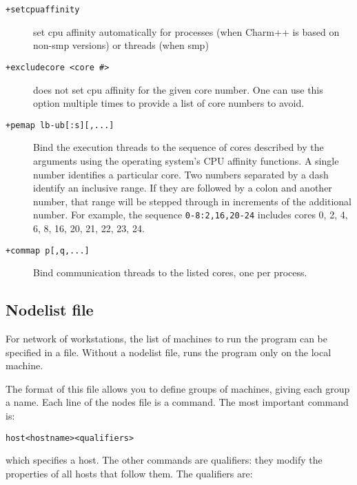 \begin{description}

\item[{\tt +setcpuaffinity}]             set cpu affinity automatically for processes (when Charm++ is based on non-smp versions) or threads (when smp)

\item[{\tt +excludecore <core \#>}]       does not set cpu affinity for the given core number. One can use this option multiple times to provide a list of core numbers to avoid.

\item[{\tt +pemap lb-ub[:s][,...]}] Bind the execution threads to the
  sequence of cores described by the arguments using the operating
  system's CPU affinity functions. A single number identifies a
  particular core. Two numbers separated by a dash identify an
  inclusive range. If they are followed by a colon and another number,
  that range will be stepped through in increments of the additional
  number. For example, the sequence {\tt 0-8:2,16,20-24} includes
  cores 0, 2, 4, 6, 8, 16, 20, 21, 22, 23, 24.

\item[{\tt +commap p[,q,...]}] Bind communication threads to the
  listed cores, one per process.

\end{description}

\subsection{Nodelist file}

For network of workstations,
the list of machines to run the program can be specified in a file.  
Without a nodelist file, \charmpp{} runs the program only on the 
local machine.

The format of this file
allows you to define groups of machines, giving each group a name.
Each line of the nodes file is a command.  The most important command
is:

\begin{alltt}
host <hostname> <qualifiers>
\end{alltt}

which specifies a host.  The other commands are qualifiers: they modify
the properties of all hosts that follow them.  The qualifiers are:


